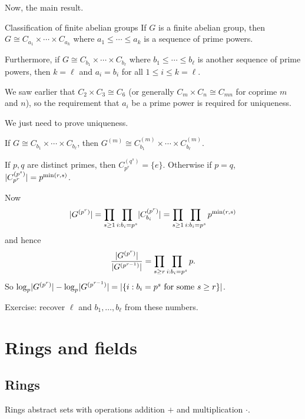 \documentclass[12pt,letterpaper]{report}
\begin{document}
Now, the main result.

\begin{thm}{Classification of finite abelian groups}{}
  If $G$ is a finite abelian group, then
  $G \cong C_{a_1} \times \cdots \times C_{a_k}$ where $a_1 \leq \cdots \leq a_k$
  is a sequence of prime powers.

  Furthermore, if $G \cong C_{b_1} \times \cdots \times C_{b_\ell}$ where
  $b_1 \leq \cdots \leq b_\ell$ is another sequence of prime powers, then $k = \ell$ and $a_i = b_i$
  for all $1 \leq i \leq k = \ell$.
\end{thm}

\begin{ex}
  We saw earlier that $C_2 \times C_3 \cong C_6$ (or generally $C_m \times C_n \cong C_{mn}$ for
  coprime $m$ and $n$), so the requirement that $a_i$ be a prime power is required for uniqueness.
\end{ex}

\begin{thmproof}
  We just need to prove uniqueness.

  If $G \cong C_{b_1} \times \cdots \times C_{b_\ell}$, then
  $G^{(m)} \cong C_{b_1}^{(m)} \times \cdots \times C_{b_\ell}^{(m)}$.

  If $p, q$ are distinct primes, then $C_{p^r}^{(q^s)} = \{e\}$.
  Otherwise if $p = q$, $\lvert C_{p^r}^{(p^s)}\rvert = p^{\min(r, s)}$.

  Now
  \[
    \lvert G^{(p^r)}\rvert = \prod_{s \geq 1} \prod_{i : b_i = p^s} \lvert C_{b_i}^{(p^r)}\rvert
      = \prod_{s \geq 1} \prod_{i : b_i = p^s} p^{\min(r, s)}
  \]
  and hence
  \[
    \frac{\lvert G^{(p^r)}\rvert}{\lvert G^{(p^{r - 1})}\rvert} = \prod_{s \geq r} \prod_{i : b_i = p^s} p.
  \]
  So $\log_p \lvert G^{(p^r)}\rvert - \log_p \lvert G^{(p^{r - 1})}\rvert
    = \lvert\{ i : b_i = p^s \text{ for some } s \geq r \}\rvert$.

  Exercise: recover $\ell$ and $b_1, \ldots, b_\ell$ from these numbers.
\end{thmproof}


\section{Rings and fields}

\subsection{Rings}

Rings abstract sets with operations addition $+$ and multiplication $\cdot$.
\end{document}
